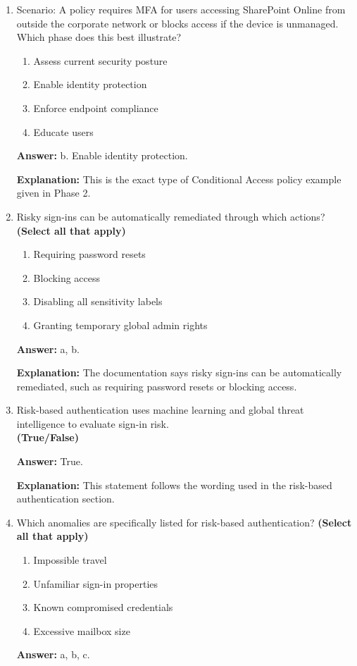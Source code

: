 \documentclass[10pt]{article}
\begin{document}
\begin{enumerate}[leftmargin=*]
\textbf{Explanation:} The documentation lists these four factors when describing Conditional Access in Phase 2.

\item Scenario: A policy requires MFA for users accessing SharePoint Online from outside the corporate network or blocks access if the device is unmanaged. Which phase does this best illustrate?
\begin{enumerate}[label=\alph*., leftmargin=1.5em]
\item Assess current security posture
\item Enable identity protection
\item Enforce endpoint compliance
\item Educate users
\end{enumerate}
\textbf{Answer:} b. Enable identity protection.

\textbf{Explanation:} This is the exact type of Conditional Access policy example given in Phase 2.

\item Risky sign-ins can be automatically remediated through which actions? \textbf{(Select all that apply)}
\begin{enumerate}[label=\alph*., leftmargin=1.5em]
\item Requiring password resets
\item Blocking access
\item Disabling all sensitivity labels
\item Granting temporary global admin rights
\end{enumerate}
\textbf{Answer:} a, b.

\textbf{Explanation:} The documentation says risky sign-ins can be automatically remediated, such as requiring password resets or blocking access.

\item Risk-based authentication uses machine learning and global threat intelligence to evaluate sign-in risk.\\
\textbf{(True/False)}

\textbf{Answer:} True.

\textbf{Explanation:} This statement follows the wording used in the risk-based authentication section.

\item Which anomalies are specifically listed for risk-based authentication? \textbf{(Select all that apply)}
\begin{enumerate}[label=\alph*., leftmargin=1.5em]
\item Impossible travel
\item Unfamiliar sign-in properties
\item Known compromised credentials
\item Excessive mailbox size
\end{enumerate}
\textbf{Answer:} a, b, c.


\end{enumerate}
\end{document}

